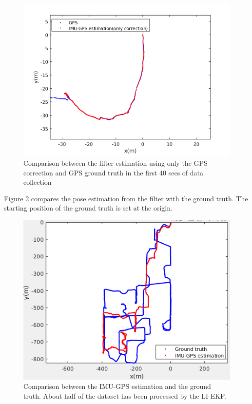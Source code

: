 \begin{figure}[hbt!]
    \centering
    \includegraphics[width = 0.8\linewidth]{media/OnlyGPS.png}
    \caption{Comparison between the filter estimation using only the GPS correction and GPS ground truth in the first 40 secs of data collection}
    \label{fig:imugps-40s}
\end{figure}

Figure \ref{fig:complete_IMUGPS_result} compares the pose estimation from the filter with the ground truth. The starting position of the ground truth is set at the origin.

\begin{figure}[hbt!]
    \centering
    \includegraphics[width = 0.8\linewidth]{media/Complete_InEKF_Result.png}
    \caption{Comparison between the IMU-GPS estimation and the ground truth. About half of the dataset has been processed by the LI-EKF.}
    \label{fig:complete_IMUGPS_result}
\end{figure}

